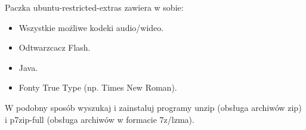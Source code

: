 Paczka \textcolor{ubuntu_orange}{ubuntu-restricted-extras} zawiera w sobie:
\begin{itemize}
\item Wszystkie możliwe kodeki audio/wideo.
\item Odtwarzcacz Flash.
\item Java.
\item Fonty True Type (np. Times New Roman).
\end{itemize}
W podobny sposób wyszukaj i zainstaluj programy \textcolor{ubuntu_orange}{unzip} (obsługa archiwów zip) i \textcolor{ubuntu_orange}{p7zip-full} (obsługa archiwów w formacie 7z/lzma).
\clearpage
